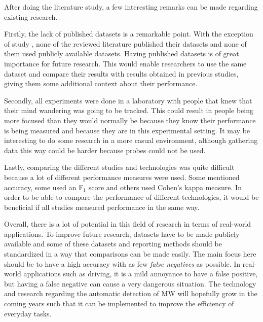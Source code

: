 After doing the literature study, a few interesting remarks can be made regarding existing research.

Firstly, the lack of published datasets is a remarkable point. With the exception of study \cite{Zhao2017ScalableApproach}, none of the reviewed literature published their datasets and none of them used publicly available datasets. Having published datasets is of great importance for future research. This would enable researchers to use the same dataset and compare their results with results obtained in previous studies, giving them some additional context about their performance.

Secondly, all experiments were done in a laboratory with people that knew that their mind wandering was going to be tracked. This could result in people being more focused than they would normally be because they know their performance is being measured and because they are in this experimental setting. It may be interesting to do some research in a more casual environment, although gathering data this way could be harder because probes could not be used.

Lastly, comparing the different studies and technologies was quite difficult because a lot of different performance measures were used. Some mentioned accuracy, some used an F$_1$ score and others used Cohen's kappa measure. In order to be able to compare the performance of different technologies, it would be beneficial if all studies measured performance in the same way.  

Overall, there is a lot of potential in this field of research in terms of real-world applications. To improve future research, datasets have to be made publicly available and some of these datasets and reporting methods should be standardized in a way that comparisons can be made easily.
The main focus here should be to have a high accuracy with as few \emph{false negatives} as possible. In real-world applications such as driving, it is a mild annoyance to have a false positive, but having a false negative can cause a very dangerous situation. The technology and research regarding the automatic detection of MW will hopefully grow in the coming years such that it can be implemented to improve the efficiency of everyday tasks.